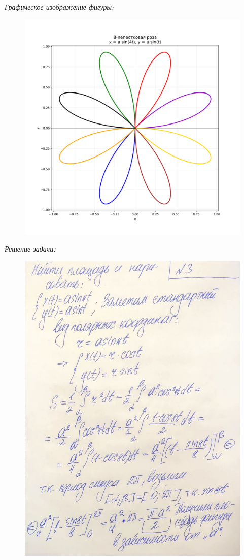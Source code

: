 \documentclass[a4paper,12pt]{article}
\begin{document}
\emph{Графическое изображение фигуры:}
\begin{figure}[H]
    \centering
    \includegraphics[width=0.9\linewidth]{../img/task3_graph.png}
    \label{fig:integral}
\end{figure}

\emph{Решение задачи:}

\begin{figure}[H]
    \centering
    \includegraphics[width=0.8\linewidth]{../img/3_1.jpg}
    \caption{}
    \label{fig:part1}
\end{figure}
\end{document}

